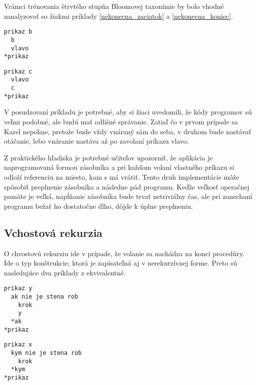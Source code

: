 Vrámci trénovania štrvtého stupňa Bloomovej taxonímie\cite{bloomtax} by bolo vhodné zanalyzovať so žiakmi príklady \ref{nekonecna_zaciatok} a \ref{nekonecna_koniec}.

\begin{lstlisting}[label=nekonecna_zaciatok,caption=Nekonečná rekurzia s volaním na začiatku,captionpos=b]
prikaz b
  b
  vlavo
*prikaz
\end{lstlisting}

\begin{lstlisting}[label=nekonecna_koniec,caption=Nekonečná rekurzia s volaním na konci,captionpos=b]
prikaz c
  vlavo
  c
*prikaz
\end{lstlisting}

V posudzovaní príkladu je potrebné, aby si žiaci uvedomili, že kódy programov sú veľmi podobné, ale budú mať odlišné správanie.
Zatiaľ čo v prvom prípade sa Karel nepohne, pretože bude vždy vnáraný sám do seba, v druhom bude nastávať otáčanie, lebo vnáranie nastáva až po zavolaní príkazu vlavo.

Z praktického hľadiska je potrebné učiteľov upozorniť, že aplikácia je naprogramovaná formou zásobníka a pri každom volaní vlastného príkazu si odloží referenciu na miesto, kam s má vrátiť.
Tento druh implementácie môže spôsobiť preplnenie zásobníka a následne pád programu.
Keďže veľkosť operačnej pamäte je veľká, napĺňanie zásobníka bude trvať netriviálny čas, ale pri zanechaní programu bežať ho dostatočne dlho, dôjde k úplne preplneniu.

\subsection{Vchostová rekurzia}

O chvostovú rekurziu ide v prípade, že volanie sa nachádza na konci procedúry. Ide o typ konštrukcie, ktorá je zapísateľná aj v nerekurzívnej forme. Preto sú nasledujúce dva príklady z \cite{Snajder03} ekvivalentné.

\begin{lstlisting}[label=chvostova_rekurzia,caption=Chvostová prekurzia,captionpos=b]
prikaz y
  ak nie je stena rob
    krok
    y
  *ak
*prikaz
\end{lstlisting}

\begin{lstlisting}[label=eq_chvostova_rek,caption=Nerekuzívne riešenie problému \ref{chvostova_rekurzia},captionpos=b]
prikaz x
  kym nie je stena rob
    krok
  *kym
*prikaz
\end{lstlisting}


